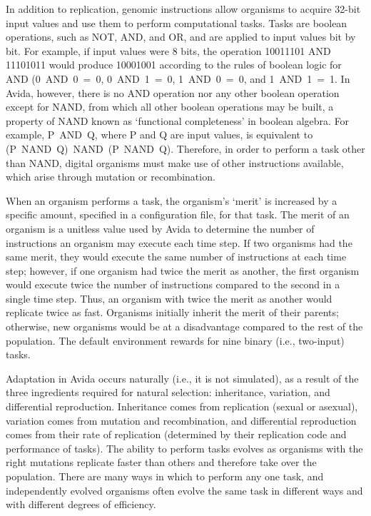 \begin{doublespace}
In addition to replication, genomic instructions allow organisms
to acquire 32-bit input values and use them to perform computational tasks.
%
Tasks are boolean operations, such as NOT, AND, and OR,
and are applied to input values bit by bit.
%
For example, if input values were 8 bits,
the operation 10011101 AND 11101011 would produce 10001001
according to the rules of boolean logic for AND
(0~AND~0~=~0, 0~AND~1~=~0, 1~AND~0~=~0, and 1~AND~1~=~1.
%
In Avida, however, there is no AND operation nor any other boolean operation
except for NAND, from which all other boolean operations may be built,
a property of NAND known as `functional completeness' in boolean algebra.
%
For example, P~AND~Q, where P and Q are input values,
is equivalent to (P~NAND~Q)~NAND~(P~NAND~Q).
%
Therefore, in order to perform a task other than NAND,
digital organisms must make use of other instructions available,
which arise through mutation or recombination.



When an organism performs a task, the organism's `merit' is increased
by a specific amount, specified in a configuration file, for that task.
%
The merit of an organism is a unitless value used by Avida
to determine the number of instructions an organism may execute each time step.
%
If two organisms had the same merit,
they would execute the same number of instructions at each time step;
however, if one organism had twice the merit as another,
the first organism would execute twice the number of instructions
compared to the second in a single time step.
%
Thus, an organism with twice the merit as another
would replicate twice as fast.
%
Organisms initially inherit the merit of their parents;
otherwise, new organisms would be at a disadvantage
compared to the rest of the population.
%
The default environment rewards for nine binary (i.e., two-input) tasks.



Adaptation in Avida occurs naturally (i.e., it is not simulated),
as a result of the three ingredients required for natural selection:
inheritance, variation, and differential reproduction.
%
Inheritance comes from replication (sexual or asexual),
variation comes from mutation and recombination,
and differential reproduction comes from their rate of replication
(determined by their replication code and performance of tasks).
%
The ability to perform tasks evolves as organisms with the right mutations
replicate faster than others and therefore take over the population.
%
There are many ways in which to perform any one task,
and independently evolved organisms often evolve the same task
in different ways and with different degrees of efficiency.




\end{doublespace}
